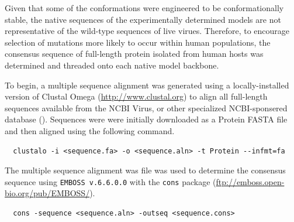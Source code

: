 \documentclass[10pt]{article}
\begin{document}
Given that some of the conformations were engineered to be conformationally stable, the native sequences of the experimentally determined models are not representative of the wild-type sequences of live virues. Therefore, to encourage selection of mutations more likely to occur within human populations, the consensus sequence of full-length protein isolated from human hosts was determined and threaded onto each native model backbone. 

To begin, a multiple sequence alignment was generated using a locally-installed version of Clustal Omega (\url{http://www.clustal.org}) to align all full-length sequences available from the NCBI Virus, or other specialized NCBI-sponsered database (). Sequences were were initially downloaded as a Protein FASTA file and then aligned using the following command.\\

\begin{lstlisting}
  clustalo -i <sequence.fa> -o <sequence.aln> -t Protein --infmt=fa
\end{lstlisting}

The multiple sequence alignment was file was used to determine the consensus sequence using \texttt{EMBOSS v.6.6.0.0} with the \texttt{cons} package (\url{ftp://emboss.open-bio.org/pub/EMBOSS/}). \\

\begin{lstlisting}
  cons -sequence <sequence.aln> -outseq <sequence.cons>
\end{lstlisting}
\end{document}
